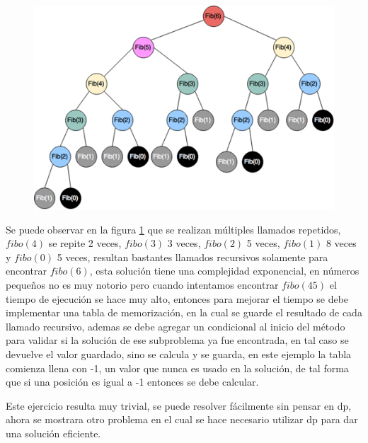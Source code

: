 \documentclass[12pt, a4paper]{article}
\newcommand\cppfile[2][]{

}
\begin{document}
	\begin{figure}[!htb]
		\centering
		\includegraphics[scale=0.9]{Programacion_dinamica/imagenes/introduccion/arbol_recursion}
		\caption{}
		\label{dp:introduccion:arbol_recursion}
	\end{figure}
	
	Se puede observar en la figura \ref{dp:introduccion:arbol_recursion} que se realizan múltiples 
	llamados repetidos, $fibo(4)$ se repite 2 veces, $fibo(3)$ 3 veces, $fibo(2)$ 5 veces, $fibo(1)$ 8 veces y 
	$fibo(0)$ 5 veces, resultan bastantes llamados recursivos solamente para encontrar $fibo(6)$, esta solución tiene 
	una complejidad exponencial, en números pequeños no es muy notorio pero cuando intentamos encontrar $fibo(45)$ el 
	tiempo de ejecución se hace muy alto, entonces para mejorar el tiempo se debe implementar una tabla de  
	memorización, en la cual se guarde el resultado de cada llamado recursivo, ademas se debe agregar un condicional al 
	inicio del método para validar si la solución de ese subproblema ya fue encontrada, en tal caso se devuelve el  
	valor guardado, sino se calcula y se guarda, en este ejemplo la tabla comienza llena con -1, un valor que nunca es  
	usado en la solución, de tal forma que si una posición es igual a -1 entonces se debe calcular.
	
	\begin{minipage}{\linewidth}
		\cppfile[24-31]{Programacion_dinamica/codigos/fibo.cpp}
	\end{minipage}
	
	Este ejercicio resulta muy trivial, se puede resolver fácilmente sin pensar en dp, ahora se mostrara otro
	problema en el cual se hace necesario utilizar dp para dar una solución eficiente.
	
\end{document}
